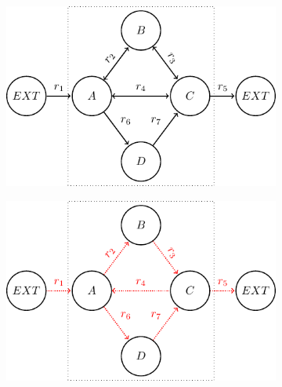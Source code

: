 \begin{figure}[H]
    \centering
    \caption{Simple model with two internal loops}
    \label{fig:two_internal_loops}
    \begin{subfigure}{0.47\textwidth}
    \centering
        \includegraphics[width=0.99\linewidth]{Images/tikz_graphs_two_loops.pdf}
        \caption{}
    \end{subfigure}
    \begin{subfigure}{0.47\textwidth}
    \centering
        \includegraphics[width=0.99\linewidth]{Images/tikz_graphs_two_loops_fba.pdf}
        \caption{}
    \end{subfigure}
    \par \bigskip
    \begin{subfigure}{0.47\textwidth}
    \centering

\end{subfigure}
\end{figure}
